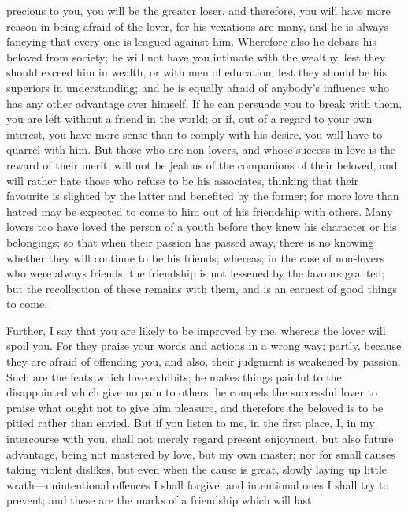 \documentclass[11pt,letter]{article}
\begin{document}
precious to you, you will be the greater loser, and therefore, you will have more reason in being afraid of the lover, for his vexations are many, and he is always fancying that every one is leagued against him. Wherefore also he debars his beloved from society; he will not have you intimate with the wealthy, lest they should exceed him in wealth, or with men of education, lest they should be his superiors in understanding; and he is equally afraid of anybody's influence who has any other advantage over himself. If he can persuade you to break with them, you are left without a friend in the world; or if, out of a regard to your own interest, you have more sense than to comply with his desire, you will have to quarrel with him. But those who are non-lovers, and whose success in love is the reward of their merit, will not be jealous of the companions of their beloved, and will rather hate those who refuse to be his associates, thinking that their favourite is slighted by the latter and benefited by the former; for more love than hatred may be expected to come to him out of his friendship with others. Many lovers too have loved the person of a youth before they knew his character or his belongings; so that when their passion has passed away, there is no knowing whether they will continue to be his friends; whereas, in the case of non-lovers who were always friends, the friendship is not lessened by the favours granted; but the recollection of these remains with them, and is an earnest of good things to come.

\par  Further, I say that you are likely to be improved by me, whereas the lover will spoil you. For they praise your words and actions in a wrong way; partly, because they are afraid of offending you, and also, their judgment is weakened by passion. Such are the feats which love exhibits; he makes things painful to the disappointed which give no pain to others; he compels the successful lover to praise what ought not to give him pleasure, and therefore the beloved is to be pitied rather than envied. But if you listen to me, in the first place, I, in my intercourse with you, shall not merely regard present enjoyment, but also future advantage, being not mastered by love, but my own master; nor for small causes taking violent dislikes, but even when the cause is great, slowly laying up little wrath—unintentional offences I shall forgive, and intentional ones I shall try to prevent; and these are the marks of a friendship which will last.
\end{document}
